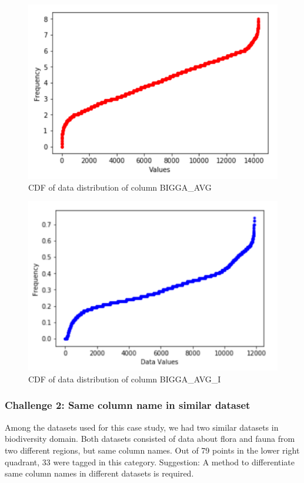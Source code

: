 \begin{figure}[H]
	\centering
	\includegraphics[width=0.8\columnwidth]{graphics/Challenge1_1}
	\caption{CDF of data distribution of column BIGGA\_AVG}
	\label{fig:Distribution 1}
\end{figure}

\begin{figure}[H]
	\centering
	\includegraphics[width=0.8\columnwidth]{graphics/Challenge1_2}
	\caption{CDF of data distribution of column BIGGA\_AVG\_I}
	\label{fig:Distribution 2}
\end{figure}

\subsubsection{Challenge 2: Same column name in similar dataset}
Among the datasets used for this case study, we had two similar datasets in biodiversity domain. Both datasets consisted of data about flora and fauna from two different regions, but same column names. Out of 79 points in the lower right quadrant, 33 were tagged in this category.
Suggestion: A method to differentiate same column names in different datasets is required.

